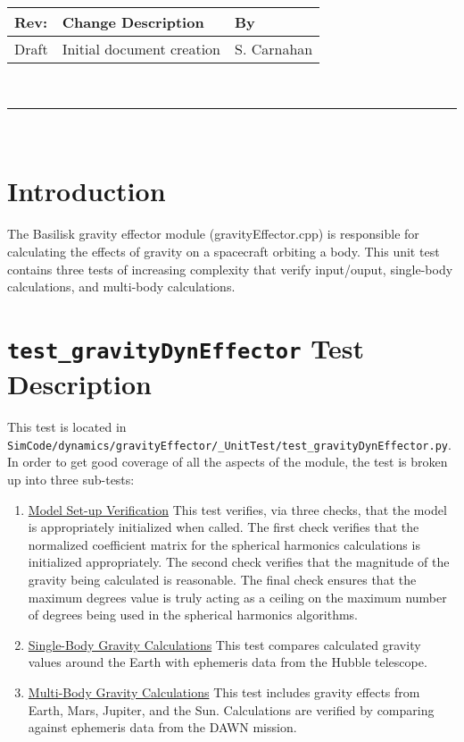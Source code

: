 \documentclass[]{BasiliskReportMemo}
\begin{document}
\makeCover


%
%
\pagestyle{empty}
{\renewcommand{\arraystretch}{1.1}
\noindent
\begin{longtable}{|p{0.5in}|p{4.5in}|p{1.14in}|}
\hline
{\bfseries Rev}: & {\bfseries Change Description} & {\bfseries By} \\
\hline
Draft & Initial document creation & S. Carnahan \\
\hline

\end{longtable}
}

\newpage
\setcounter{page}{1}
\pagestyle{fancy}

\tableofcontents
~\\ \hrule ~\\


\section{Introduction}
The Basilisk gravity effector module (gravityEffector.cpp) is responsible for calculating the effects of gravity on a spacecraft orbiting a body. This unit test contains three tests of increasing complexity that verify input/ouput, single-body calculations, and multi-body calculations.

\section{{\tt test\_gravityDynEffector} Test Description}

This test is located in {\tt SimCode/dynamics/gravityEffector/\_UnitTest/test\_gravityDynEffector.py}. In order to get good coverage of all the aspects of the module, the test is broken up into three sub-tests: \par

\begin{enumerate}
	\item \underline{Model Set-up Verification} This test verifies, via three checks, that the model is appropriately initialized when called. The first check verifies that the normalized coefficient matrix for the spherical harmonics calculations is initialized appropriately. The second check verifies that the magnitude of the gravity being calculated is reasonable. The final check ensures that the maximum degrees value is truly acting as a ceiling on the maximum number of degrees being used in the spherical harmonics algorithms.
	\item \underline{Single-Body Gravity Calculations} This test compares calculated gravity values around the Earth with ephemeris data from the Hubble telescope.
	\item \underline{Multi-Body Gravity Calculations} This test includes gravity effects from Earth, Mars, Jupiter, and the Sun. Calculations are verified by comparing against ephemeris data from the DAWN mission.
\end{enumerate} 
\end{document}
